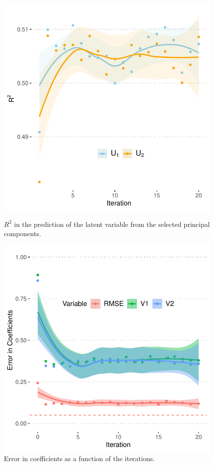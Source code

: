 \documentclass{article}
\begin{document}
\begin{figure}[ht]
  \centering
  \begin{minipage}[t]{0.42\linewidth}
    \includegraphics[scale=0.3]{images/fig_paper_r2lat.pdf}
    \caption{\label{fig:latrecons}$R^2$ in the prediction of the latent variable from the selected principal components.\medskip}
  \end{minipage}\hfill
  \begin{minipage}[t]{0.42\linewidth}
    \includegraphics[scale=0.3]{images/fig_paper_errors.pdf}
    \caption{\label{fig:errorcoef}Error in coefficients as a function of the iterations.\medskip}
  \end{minipage}
\end{figure}
\end{document}
